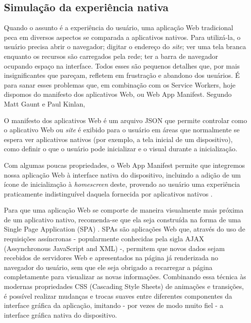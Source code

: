 \documentclass[
	article,			%
	12pt,				%
	oneside,			%
	a4paper,			%
	english,			%
	brazil,				%
	sumario=tradicional
	]{abntex2}
\begin{document}
\subsection{Simulação da experiência nativa}

Quando o assunto é a experiência do usuário, uma aplicação Web tradicional peca em diversos aspectos se comparada a aplicativos nativos. Para utilizá-la, o usuário precisa abrir o navegador; digitar o endereço do \textit{site}; ver uma tela branca enquanto os recursos são carregados pela rede; ter a barra de navegador ocupando espaço na interface. Todos esses são pequenos detalhes que, por mais insignificantes que pareçam, refletem em frustração e abandono dos usuários. É para sanar esses problemas que, em combinação com os Service Workers, hoje dispomos do manifesto dos aplicativos Web, ou Web App Manifest. Segundo Matt Gaunt e Paul Kinlan,

\begin{citacao}
	O manifesto dos aplicativos Web é um arquivo JSON que permite controlar como o aplicativo Web ou \textit{site} é exibido para o usuário em áreas que normalmente se espera ver aplicativos nativos (por exemplo, a tela inicial de um dispositivo), como definir o que o usuário pode inicializar e o visual durante a inicialização. \cite{gaunt-kinlan-2017}
\end{citacao}

Com algumas poucas propriedades, o Web App Manifest permite que integremos nossa aplicação Web à interface nativa do dispositivo, incluindo a adição de um ícone de inicialização à \textit{homescreen} deste, provendo ao usuário uma experiência praticamente indistinguível daquela fornecida por aplicativos nativos \cite{lopes-2016}.

Para que uma aplicação Web se comporte de maneira visualmente mais próxima de um aplicativo nativo, recomenda-se que ela seja construída na forma de uma Single Page Application (SPA) \cite{lopes-2016}. SPAs são aplicações Web que, através do uso de requisições assíncronas - popularmente conhecidas pela sigla AJAX (Assynchronous JavaScript and XML) -, permitem que novos dados sejam recebidos de servidores Web e apresentados na página já renderizada no navegador do usuário, sem que ele seja obrigado a recarregar a página completamente para visualizar as novas informações. Combinando essa técnica às modernas propriedades CSS (Cascading Style Sheets) de animações e transições, é possível realizar mudanças e trocas suaves entre diferentes componentes da interface gráfica da aplicação, imitando - por vezes de modo muito fiel - a interface gráfica nativa do dispositivo.
\end{document}
